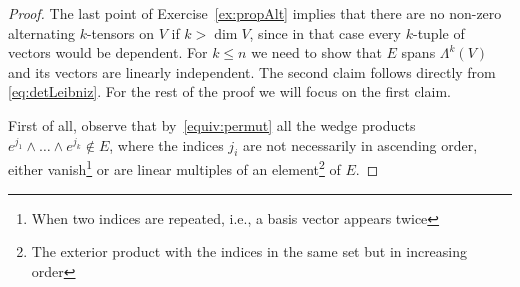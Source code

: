 \begin{proof}
	The last point of Exercise~\ref{ex:propAlt} implies that there are no non-zero alternating $k$-tensors on $V$ if $k >\dim V$, since in that case every $k$-tuple of vectors would be dependent.
	For $k\leq n$ we need to show that $E$ spans $\Lambda^k(V)$ and its vectors are linearly independent.
	The second claim follows directly from \eqref{eq:detLeibniz}. For the rest of the proof we will focus on the first claim.

	First of all, observe that by~\eqref{equiv:permut} all the wedge products ${e^{j_1}\wedge\ldots\wedge e^{j_k}\not\in E}$, where the indices $j_i$ are not necessarily in ascending order, either vanish\footnote{When two indices are repeated, i.e., a basis vector appears twice} or are linear multiples of an element\footnote{The exterior product with the indices in the same set but in increasing order} of $E$.


\end{proof}
